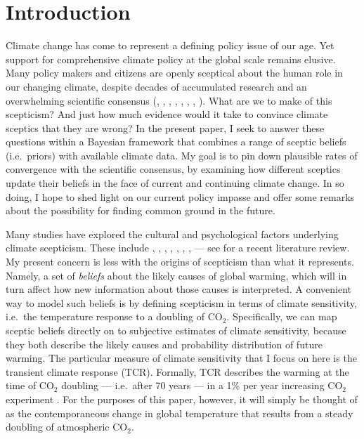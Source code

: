 \documentclass[smallextended]{svjour3}       %
\begin{document}
\hypertarget{sec:intro}{%
\section{Introduction}\label{sec:intro}}

Climate change has come to represent a defining policy issue of our age.
Yet support for comprehensive climate policy at the global scale remains
elusive. Many policy makers and citizens are openly sceptical about the
human role in our changing climate, despite decades of accumulated
research and an overwhelming scientific consensus
(\cite{oreskes2004beyond}, \cite{anderegg2010expert},
\cite{doran2011examining}, \cite{cook2013quantifying},
\cite{verheggen2014scientists}, \cite{tol2014quantifying},
\cite{cook2016consensus}, \cite{saad2019americans}). What are we to make
of this scepticism? And just how much evidence would it take to convince
climate sceptics that they are wrong? In the present paper, I seek to
answer these questions within a Bayesian framework that combines a range
of sceptic beliefs (i.e.~priors) with available climate data. My goal is
to pin down plausible rates of convergence with the scientific
consensus, by examining how different sceptics update their beliefs in
the face of current and continuing climate change. In so doing, I hope
to shed light on our current policy impasse and offer some remarks about
the possibility for finding common ground in the future.

Many studies have explored the cultural and psychological factors
underlying climate scepticism. These include \cite{kahan2011cultural},
\cite{kahan2012polarizing}, \cite{mccright2011cool},
\cite{mccright2011politicization}, \cite{corner2012uncertainty},
\cite{ranney2012changing}, \cite{clark2013knowledge},
\cite{lewandowsky2019influence} --- see \cite{hornsey2016meta} for a
recent literature review. My present concern is less with the origins of
scepticism than what it represents. Namely, a set of \emph{beliefs}
about the likely causes of global warming, which will in turn affect how
new information about those causes is interpreted. A convenient way to
model such beliefs is by defining scepticism in terms of climate
sensitivity, i.e.~the temperature response to a doubling of CO\(_2\).
Specifically, we can map sceptic beliefs directly on to subjective
estimates of climate sensitivity, because they both describe the likely
causes and probability distribution of future warming. The particular
measure of climate sensitivity that I focus on here is the transient
climate response (TCR). Formally, TCR describes the warming at the time
of CO\(_2\) doubling --- i.e.~after 70 years --- in a 1\% per year
increasing CO\(_2\) experiment \cite{ipcc2013i}. For the purposes of
this paper, however, it will simply be thought of as the contemporaneous
change in global temperature that results from a steady doubling of
atmospheric CO\(_2\).
\end{document}
